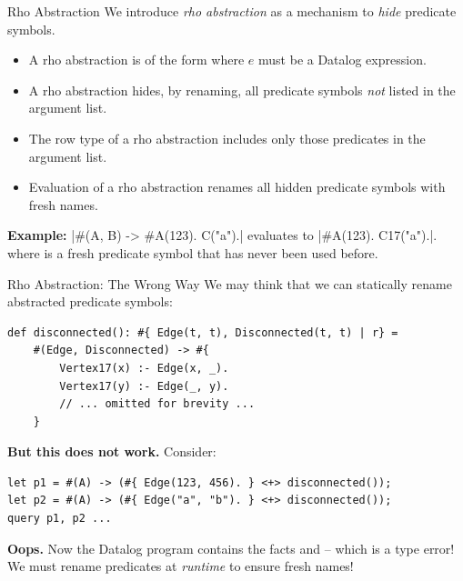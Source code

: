 \begin{frame}[fragile]{Rho Abstraction}
We introduce \emph{rho abstraction} as a mechanism to \emph{hide} predicate symbols.

\small
\begin{itemize}
    \item A rho abstraction is of the form  where $e$ must
    be a Datalog expression.
    \item A rho abstraction hides, by renaming, all predicate symbols \emph{not}
    listed in the argument list. 
    \item The row type of a rho abstraction includes only those predicates in
    the argument list. 
    \item Evaluation of a rho abstraction renames all hidden predicate symbols
    with fresh names. 
\end{itemize}

\textbf{Example:} \Code|#(A, B) -> #{A(123). C("a").}| evaluates to \Code|#{A(123). C17("a").}|. 
where  is a fresh predicate symbol that has never been used before.
\end{frame}

\begin{frame}[fragile]{Rho Abstraction: The Wrong Way}
We may think that we can statically rename abstracted predicate symbols:

\begin{lstlisting}[language=flix, xleftmargin=0.8cm]
def disconnected(): #{ Edge(t, t), Disconnected(t, t) | r} = 
    #(Edge, Disconnected) -> #{
        Vertex17(x) :- Edge(x, _).
        Vertex17(y) :- Edge(_, y).
        // ... omitted for brevity ...
    }
\end{lstlisting}

\textbf{But this does not work.} Consider:

\begin{lstlisting}[language=flix, xleftmargin=0.8cm]
let p1 = #(A) -> (#{ Edge(123, 456). } <+> disconnected());
let p2 = #(A) -> (#{ Edge("a", "b"). } <+> disconnected());
query p1, p2 ...
\end{lstlisting}

\textbf{Oops.} Now the Datalog program contains the facts 
and  -- which is a type error! We must rename predicates at
\emph{runtime} to ensure fresh names!
\end{frame}

